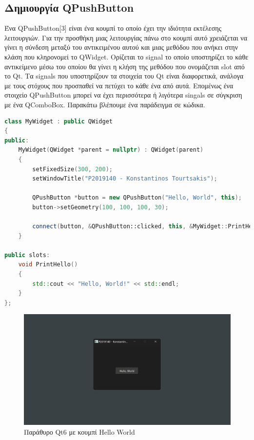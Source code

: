 \subsection{Δημιουργία QPushButton}
Ένα QPushButton[3] είναι ένα κουμπί το οποίο έχει την ιδιότητα εκτέλεσης λειτουργιών.
Για την προσθήκη μιας λειτουργίας πάνω στο κουμπί αυτό χρειάζεται να γίνει η
σύνδεση μεταξύ του αντικειμένου αυτού και μιας μεθόδου που ανήκει στην κλάση που
κληρονομεί το QWidget. Ορίζεται το signal το οποίο υποστηρίζει το κάθε αντικείμενο
μέσω του οποίου θα γίνει η κλήση της μεθόδου που ονομάζεται slot από το Qt.
Τα signals που υποστηρίζουν τα στοιχεία του Qt είναι διαφορετικά, ανάλογα με τους
στόχους που προσπαθεί να πετύχει το κάθε ένα από αυτά. Επομένως ένα στοιχείο QPushButton
μπορεί να έχει περισσότερα ή λιγότερα singals σε σύγκριση με ένα QComboBox.
Παρακάτω βλέπουμε ένα παράδειγμα σε κώδικα.
\begin{lstlisting}[language=C++, style=cppstyle]
class MyWidget : public QWidget 
{
public:
    MyWidget(QWidget *parent = nullptr) : QWidget(parent) 
    {
        setFixedSize(300, 200);
        setWindowTitle("P2019140 - Konstantinos Tourtsakis");

        QPushButton *button = new QPushButton("Hello, World", this);
        button->setGeometry(100, 100, 100, 30);

        connect(button, &QPushButton::clicked, this, &MyWidget::PrintHello);
    }

public slots:
    void PrintHello() 
    {
        std::cout << "Hello, World!" << std::endl;
    }
};
\end{lstlisting}


\begin{figure}[H]
    \centering
    \includegraphics[width=1.0\textwidth]{./images/QPushButton.png}
    \caption{Παράθυρο Qt6 με κουμπί Hello World}
\end{figure}


